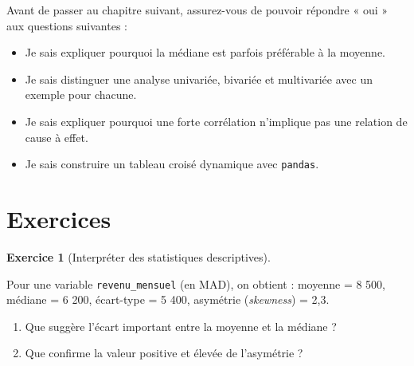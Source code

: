 \documentclass[
  french,
  letterpaper,
  open=any]{scrbook}
\providecommand{\tightlist}{%
  \setlength{\itemsep}{0pt}\setlength{\parskip}{0pt}}
\theoremstyle{definition}
\theoremstyle{definition}
\newtheorem{exercise}{Exercice}[section]
\theoremstyle{remark}
\begin{document}
\begin{tcolorbox}[enhanced jigsaw, arc=.35mm, bottomrule=.15mm, bottomtitle=1mm, breakable, colback=white, colbacktitle=quarto-callout-note-color!10!white, colframe=quarto-callout-note-color-frame, coltitle=black, left=2mm, leftrule=.75mm, opacityback=0, opacitybacktitle=0.6, rightrule=.15mm, title=\textcolor{quarto-callout-note-color}{\faInfo}\hspace{0.5em}{Auto-évaluation}, titlerule=0mm, toprule=.15mm, toptitle=1mm]

Avant de passer au chapitre suivant, assurez-vous de pouvoir répondre «
oui » aux questions suivantes :

\begin{itemize}
\tightlist
\item[$\square$]
  Je sais expliquer pourquoi la médiane est parfois préférable à la
  moyenne.
\item[$\square$]
  Je sais distinguer une analyse univariée, bivariée et multivariée avec
  un exemple pour chacune.
\item[$\square$]
  Je sais expliquer pourquoi une forte corrélation n'implique pas une
  relation de cause à effet.
\item[$\square$]
  Je sais construire un tableau croisé dynamique avec \texttt{pandas}.
\end{itemize}

\end{tcolorbox}

\section{Exercices}\label{exercices-2}

\begin{exercise}[Interpréter des statistiques
descriptives]\protect\hypertarget{exr-eda-1}{}\label{exr-eda-1}

Pour une variable \texttt{revenu\_mensuel} (en MAD), on obtient :
moyenne = 8 500, médiane = 6 200, écart-type = 5 400, asymétrie
(\emph{skewness}) = 2,3.

\begin{enumerate}
\def\labelenumi{\alph{enumi}.}
\tightlist
\item
  Que suggère l'écart important entre la moyenne et la médiane ?
\item
  Que confirme la valeur positive et élevée de l'asymétrie ?
\end{enumerate}

\end{exercise}
\end{document}
